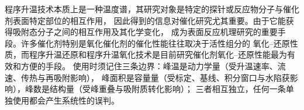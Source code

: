\begin{methodsum}
程序升温技术本质上是一种温度谱，其研究对象是特定的探针或反应物分子与催化剂表面特定部位的相互作用，
因此得到的信息对催化研究尤其重要。由于它能获得吸附态分子之间的相互作用及其化学变化，
成为表面反应机理研究的重要手段。许多催化剂特别是氧化催化剂的催化性能往往取决于活性组分的
氧化--还原性质，而程序升温还原和程序升温氧化技术是目前研究催化剂氧化--还原性能最为有效和方便的手段。
使用时须记住三条边界：峰温是动力学量（受升温速率、流速、传热与再吸附影响），
峰面积是容量量（受标定、基线、积分窗口与水陷获影响），峰数是结构量（受峰重叠与吸附质转化影响）；
三者相互独立，任何一条单独使用都会产生系统性的误判。
\end{methodsum}

